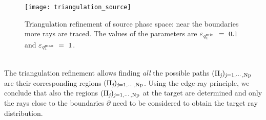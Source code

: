 \begin{figure}[h]
  \begin{center}
  \texttt{[image: triangulation\_source]}
  \end{center}
  \caption{Triangulation refinement of source phase space:
  near the boundaries more rays are traced.
    The values of the parameters are $\varepsilon_{\textit{q}_1^\textrm{min}}~=~ 0.1$ and $\varepsilon_{\textit{q}_1^\textrm{max}}~=~1$.}
   \label{fig:triangulation_refinement}
  \end{figure}
\\ \indent The triangulation refinement allows finding \textit{all} the possible paths $(\Pi_{\textit{j}})_{\textit{j} = 1, \cdots, \textrm{Np}}$ are their corresponding regions $(\Pi_{\textit{j}})_{\textit{j} = 1, \cdots, \textrm{Np}}$. Using the edge-ray principle, we conclude that also the regions $(\Pi_{\textit{j}})_{\textit{j} = 1, \cdots, \textrm{Np}}$ at the target are determined and only the rays close to the boundaries
$\partial$ need to be considered to obtain the target ray distribution.
